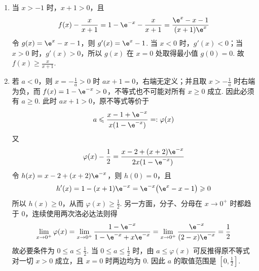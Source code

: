 \begin{solution}
\begin{enumerate}
\item 当 \(x>-1\) 时，\(x+1>0\)，且
\[
f(x)-\frac{x}{x+1}=1-\e^{-x}-\frac{x}{x+1}=\frac{\e^x-x-1}{(x+1)\e^x}
\]
令 \(g(x)=\e^x-x-1\)，则 \(g'(x)=\e^x-1\). 当 \(x<0\) 时，\(g'(x)<0\)；当 \(x>0\) 时，\(g'(x)>0\)，所以 \(g(x)\) 在 \(x=0\) 处取得最小值 \(g(0)=0\). 故 \(f(x)\geqslant\frac{x}{x+1}\).

\item 若 \(a<0\)，则 \(x=-\frac{1}{a}>0\) 时 \(ax+1=0\)，右端无定义；并且取 \(x>-\frac{1}{a}\) 时右端为负，而 \(f(x)=1-\e^{-x}>0\)，不等式也不可能对所有 \(x\geqslant0\) 成立. 因此必须有 \(a\geqslant0\). 此时 \(ax+1>0\)，原不等式等价于
\[
a\leqslant\frac{x-1+\e^{-x}}{x(1-\e^{-x})}=:\varphi(x)
\]
又
\[
\varphi(x)-\frac{1}{2}=\frac{x-2+(x+2)\e^{-x}}{2x(1-\e^{-x})}
\]
令 \(h(x)=x-2+(x+2)\e^{-x}\)，则 \(h(0)=0\)，且
\[
h'(x)=1-(x+1)\e^{-x}=\e^{-x}\bigl(\e^x-x-1\bigr)\geqslant0
\]
所以 \(h(x)\geqslant0\)，从而 \(\varphi(x)\geqslant\frac{1}{2}\). 另一方面，分子、分母在 \(x\to0^+\) 时都趋于 \(0\)，连续使用两次洛必达法则得
\[
\lim_{x\to0^+}\varphi(x)
=\lim_{x\to0^+}\frac{1-\e^{-x}}{1-\e^{-x}+x\e^{-x}}
=\lim_{x\to0^+}\frac{\e^{-x}}{(2-x)\e^{-x}}
=\frac{1}{2}
\]
故必要条件为 \(0\leqslant a\leqslant\frac{1}{2}\). 当 \(0\leqslant a\leqslant\frac{1}{2}\) 时，由 \(a\leqslant\varphi(x)\) 可反推得原不等式对一切 \(x>0\) 成立，且 \(x=0\) 时两边均为 \(0\). 因此 \(a\) 的取值范围是 \(\left[0,\frac{1}{2}\right]\).
\end{enumerate}
\end{solution}
